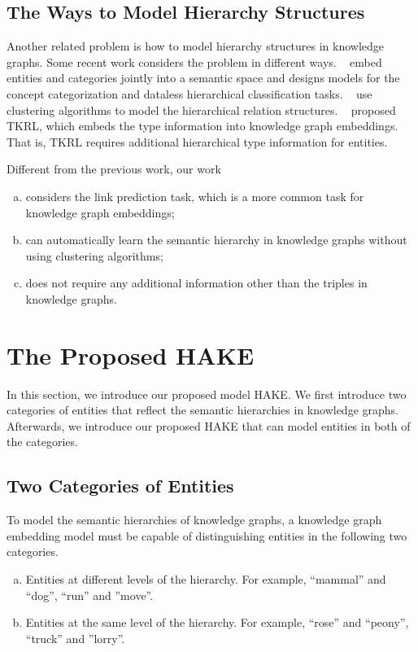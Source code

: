 \documentclass[letterpaper]{article} \usepackage{aaai20}  \usepackage{times}  \usepackage{helvet} \usepackage{courier}  \usepackage[hyphens]{url}  \usepackage{graphicx} \urlstyle{rm} \def\UrlFont{\rm}  \usepackage{graphicx}  \frenchspacing  \setlength{\pdfpagewidth}{8.5in}  \setlength{\pdfpageheight}{11in}
\newcommand{\citet}[1]{\citeauthor{#1}~\shortcite{#1}}
\begin{document}
\subsection{The Ways to Model Hierarchy Structures}
Another related problem is how to model hierarchy structures in knowledge graphs. Some recent work considers the problem in different ways. \citet{hCat} embed entities and categories jointly into a semantic space and designs models for the concept categorization and dataless hierarchical classification tasks. \citet{hRel} use clustering algorithms to model the hierarchical relation structures. \citet{hType} proposed TKRL, which embeds the type information into knowledge graph embeddings. That is, TKRL requires additional hierarchical type information for entities.  

Different from the previous work, our work
\begin{enumerate}[(a)]
    \item considers the link prediction task, which is a more common task for knowledge graph embeddings;
    \item can automatically learn the semantic hierarchy in knowledge graphs without using clustering algorithms; 
    \item does not require any additional information other than the triples in knowledge graphs. 
\end{enumerate}


\section{The Proposed HAKE}
In this section, we introduce our proposed model HAKE. We first introduce two categories of entities that reflect the semantic hierarchies in knowledge graphs. Afterwards, we introduce our proposed HAKE that can model entities in both of the categories.

\subsection{Two Categories of Entities}
To model the semantic hierarchies of knowledge graphs, a knowledge graph embedding model must be capable of distinguishing entities in the following two categories.
\begin{enumerate}[(a)]
    \item Entities at different levels of the hierarchy. For example, ``mammal'' and ``dog'', ``run'' and ''move''.
    \item Entities at the same level of the hierarchy. For example, ``rose'' and ``peony'', ``truck'' and ''lorry''.
\end{enumerate}
\end{document}
